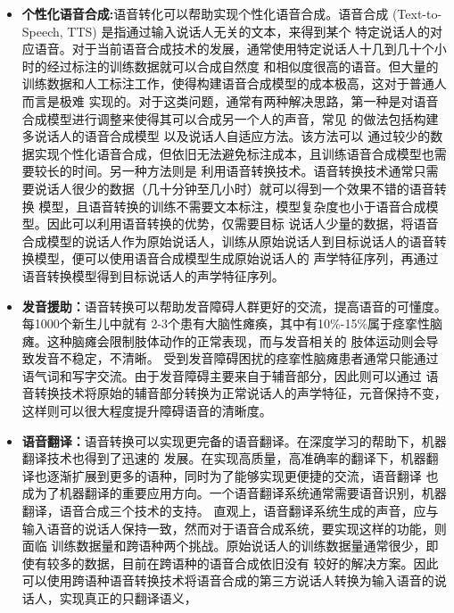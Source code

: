 \begin{itemize}
    \item \textbf{个性化语音合成:}语音转化可以帮助实现个性化语音合成。语音合成 (Text-to-Speech, TTS) 是指通过输入说话人无关的文本，来得到某个
    特定说话人的对应语音。对于当前语音合成技术的发展，通常使用特定说话人十几到几十个小时的经过标注的训练数据就可以合成自然度
    和相似度很高的语音。但大量的训练数据和人工标注工作，使得构建语音合成模型的成本极高，这对于普通人而言是极难
    实现的。对于这类问题，通常有两种解决思路，第一种是对语音合成模型进行调整来使得其可以合成另一个人的声音，常见
    的做法包括构建多说话人的语音合成模型\cite{gibiansky2017deep,ping2017deep,fan2015multi}
    以及说话人自适应方法\cite{tamura2001adaptation,wu2015study,yamagishi2009analysis}。该方法可以
    通过较少的数据实现个性化语音合成，但依旧无法避免标注成本，且训练语音合成模型也需要较长的时间。另一种方法则是
    利用语音转换技术\cite{kain1998spectral,arslan1999speaker}。语音转换技术通常只需要说话人很少的数据（几十分钟至几小时）就可以得到一个效果不错的语音转换
    模型，且语音转换的训练不需要文本标注，模型复杂度也小于语音合成模型。因此可以利用语音转换的优势，仅需要目标
    说话人少量的数据，将语音合成模型的说话人作为原始说话人，训练从原始说话人到目标说话人的语音转换模型，便可以使用语音合成模型生成原始说话人的
    声学特征序列，再通过语音转换模型得到目标说话人的声学特征序列。
    \item \textbf{发音援助：}语音转换可以帮助发音障碍人群更好的交流，提高语音的可懂度。每1000个新生儿中就有
    2-3个患有大脑性瘫痪，其中有10\%-15\%属于痉挛性脑瘫。这种脑瘫会限制肢体动作的正常表现，而与发音相关的
    肢体运动则会导致发音不稳定，不清晰\cite{hollegaard2013joint,aihara2013individuality}。
    受到发音障碍困扰的痉挛性脑瘫患者通常只能通过语气词和写字交流。由于发音障碍主要来自于辅音部分，因此则可以通过
    语音转换技术将原始的辅音部分转换为正常说话人的声学特征，元音保持不变，这样则可以很大程度提升障碍语音的清晰度。
    \item \textbf{语音翻译：}语音转换可以实现更完备的语音翻译。在深度学习的帮助下，机器翻译技术也得到了迅速的
    发展。在实现高质量，高准确率的翻译下，机器翻译也逐渐扩展到更多的语种，同时为了能够实现更便捷的交流，语音翻译
    也成为了机器翻译的重要应用方向。一个语音翻译系统通常需要语音识别，机器翻译，语音合成三个技术的支持。
    直观上，语音翻译系统生成的声音，应与输入语音的说话人保持一致，然而对于语音合成系统，要实现这样的功能，则面临
    训练数据量和跨语种两个挑战。原始说话人的训练数据量通常很少，即使有较多的数据，目前在跨语种的语音合成依旧没有
    较好的解决方案。因此可以使用跨语种语音转换技术将语音合成的第三方说话人转换为输入语音的说话人，实现真正的只翻译语义，

\end{itemize}

